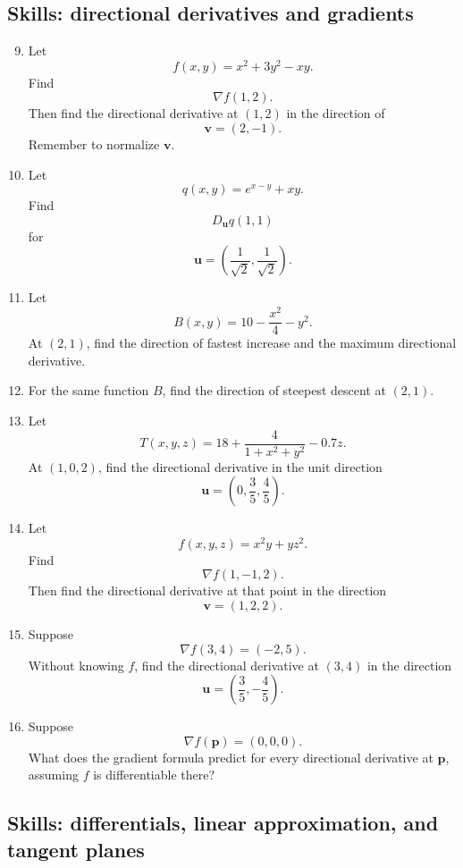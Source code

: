 \subsection*{Skills: directional derivatives and gradients}

\begin{enumerate}
\setcounter{enumi}{8}

\item Let
\[
    f(x,y)=x^2+3y^2-xy.
\]
Find
\[
    \nabla f(1,2).
\]
Then find the directional derivative at \((1,2)\) in the direction of
\[
    \mathbf v=(2,-1).
\]
Remember to normalize \(\mathbf v\).

\item Let
\[
    q(x,y)=e^{x-y}+xy.
\]
Find
\[
    D_{\mathbf u}q(1,1)
\]
for
\[
    \mathbf u=\left(\frac{1}{\sqrt2},\frac{1}{\sqrt2}\right).
\]

\item Let
\[
    B(x,y)=10-\frac{x^2}{4}-y^2.
\]
At \((2,1)\), find the direction of fastest increase and the maximum directional
derivative.

\item For the same function \(B\), find the direction of steepest descent at \((2,1)\).

\item Let
\[
    T(x,y,z)=18+\frac{4}{1+x^2+y^2}-0.7z.
\]
At \((1,0,2)\), find the directional derivative in the unit direction
\[
    \mathbf u=\left(0,\frac{3}{5},\frac{4}{5}\right).
\]

\item Let
\[
    f(x,y,z)=x^2y+yz^2.
\]
Find
\[
    \nabla f(1,-1,2).
\]
Then find the directional derivative at that point in the direction
\[
    \mathbf v=(1,2,2).
\]

\item Suppose
\[
    \nabla f(3,4)=(-2,5).
\]
Without knowing \(f\), find the directional derivative at \((3,4)\) in the direction
\[
    \mathbf u=\left(\frac35,-\frac45\right).
\]

\item Suppose
\[
    \nabla f(\mathbf p)=(0,0,0).
\]
What does the gradient formula predict for every directional derivative at
\(\mathbf p\), assuming \(f\) is differentiable there?
\end{enumerate}

\subsection*{Skills: differentials, linear approximation, and tangent planes}

